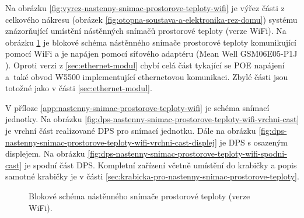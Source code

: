 Na obrázku \ref{fig:vyrez-nastenny-snimac-prostorove-teploty-wifi} je výřez části z celkového nákresu (obrázek \ref{fig:otopna-soustava-a-elektronika-rez-domu}) systému znázorňující umístění nástěnných snímačů prostorové teploty (verze WiFi). Na obrázku \ref{fig:blokove-schema-nastenny-snimac-teploty-wifi} je blokové schéma nástěnného snímače prostorové teploty komunikující pomocí WiFi a je napájen pomocí síťového adaptéru (Mean Well GSM06E05-P1J \cite{gsm06e05-p1j}). Oproti verzi z \ref{sec:ethernet-modul} chybí celá část tykající se POE napájení a~také obvod W5500 implementující ethernetovou komunikaci. Zbylé části jsou totožné jako v části \ref{sec:ethernet-modul}.

V příloze \ref{app:nastenny-snimac-prostorove-teploty-wifi} je schéma snímací jednotky. Na obrázku \ref{fig:dps-nastenny-snimac-prostorove-teploty-wifi-vrchni-cast} je vrchní část realizované DPS pro snímací jednotku. Dále na obrázku \ref{fig:dps-nastenny-snimac-prostorove-teploty-wifi-vrchni-cast-displej} je DPS s osazeným displejem. Na obrázku \ref{fig:dps-nastenny-snimac-prostorove-teploty-wifi-spodni-cast} je spodní část DPS. Kompletní zařízení včetně umístění do krabičky a popis samotné krabičky je v části \ref{sec:krabicka-pro-nastenny-snimac-prostorove-teploty}.

\begin{figure}[H]
    \centering
    \def\svgwidth{\columnwidth}
    
    \caption[]{Blokové schéma nástěnného snímače prostorové teploty (verze WiFi).}
    \label{fig:blokove-schema-nastenny-snimac-teploty-wifi}
\end{figure}


